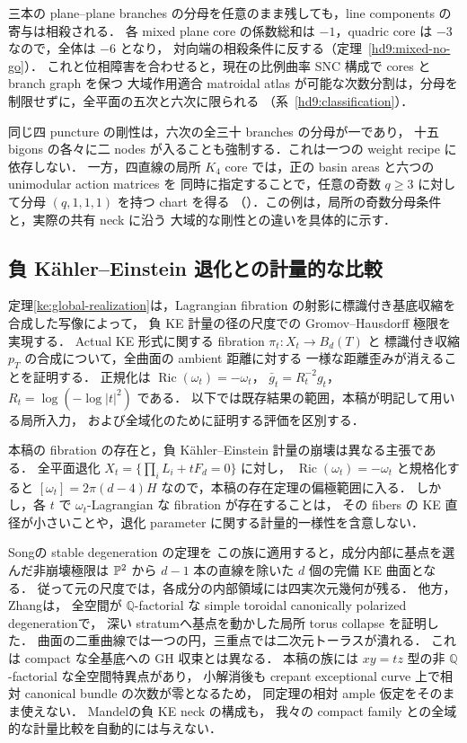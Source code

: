 三本の plane--plane branches の分母を任意のまま残しても，line components の寄与は相殺される．
各 mixed plane core の係数総和は $-1$，quadric core は $-3$ なので，全体は $-6$ となり，
対向端の相殺条件に反する（定理~\ref{hd9:mixed-no-go}）．
これと位相障害を合わせると，現在の比例曲率 SNC 構成で cores と branch graph を保つ
大域作用適合 matroidal atlas が可能な次数分割は，分母を制限せずに，全平面の五次と六次に限られる
（系~\ref{hd9:classification}）．

同じ四 puncture の剛性は，六次の全三十 branches の分母が一であり，
十五 bigons の各々に二 nodes が入ることも強制する．これは一つの weight recipe に依存しない．
一方，四直線の局所 $K_4$ core では，正の basin areas と六つの unimodular action matrices を
同時に指定することで，任意の奇数 $q\ge3$ に対して分母 $(q,1,1,1)$ を持つ chart を得る
（\cite{QuinticArithmetic}）．この例は，局所の奇数分母条件と，実際の共有 neck に沿う
大域的な剛性との違いを具体的に示す．

\subsection{負 Kähler--Einstein 退化との計量的な比較}\label{intro:ke-collapse}

定理\ref{ke:global-realization}は，Lagrangian fibration の射影に標識付き基底収縮を合成した写像によって，
負 KE 計量の径の尺度での Gromov--Hausdorff 極限を実現する．
Actual KE 形式に関する fibration $\pi_t:X_t\to B_d(T)$ と
標識付き収縮 $p_T$ の合成について，全曲面の ambient 距離に対する
一様な距離歪みが消えることを証明する．
正規化は $\operatorname{Ric}(\omega_t)=-\omega_t$，
$\bar g_t=R_t^{-2}g_t$，$R_t=\log(-\log|t|^2)$ である．
以下では既存結果の範囲，本稿が明記して用いる局所入力，
および全域化のために証明する評価を区別する．

本稿の fibration の存在と，負 Kähler--Einstein 計量の崩壊は異なる主張である．
全平面退化 $X_t=\{\prod_i L_i+tF_d=0\}$ に対し，
$\operatorname{Ric}(\omega_t)=-\omega_t$ と規格化すると
$[\omega_t]=2\pi(d-4)H$ なので，本稿の存在定理の偏極範囲に入る．
しかし，各 $t$ で $\omega_t$-Lagrangian な fibration が存在することは，
その fibers の KE 直径が小さいことや，退化 parameter に関する計量的一様性を含意しない．

Song\cite[Theorem~1.2]{SongNegativeKE}の stable degeneration の定理を
この族に適用すると，成分内部に基点を選んだ非崩壊極限は
$\mathbb P^2$ から $d-1$ 本の直線を除いた $d$ 個の完備 KE 曲面となる．
従って元の尺度では，各成分の内部領域には四実次元幾何が残る．
他方，Zhang\cite[Theorems~1.1, 2.4]{ZhangNegativeKE}は，
全空間が $\mathbb Q$-factorial な simple toroidal canonically polarized degenerationで，
深い stratumへ基点を動かした局所 torus collapse を証明した．
曲面の二重曲線では一つの円，三重点では二次元トーラスが潰れる．
これは compact な全基底への GH 収束とは異なる．
本稿の族には $xy=tz$ 型の非 $\mathbb Q$-factorial な全空間特異点があり，
小解消後も crepant exceptional curve 上で相対 canonical bundle の次数が零となるため，
同定理の相対 ample 仮定をそのまま使えない．
Mandel\cite{MandelNegativeKE}の負 KE neck の構成も，
我々の compact family との全域的な計量比較を自動的には与えない．

